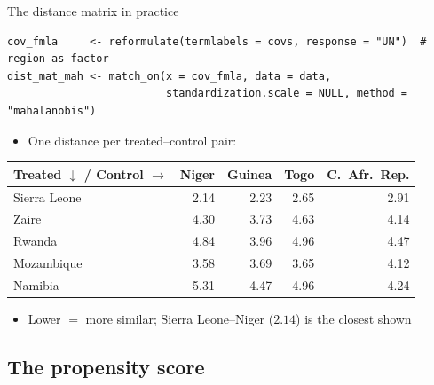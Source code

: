 \documentclass[table, xcolor = {dvipsnames}, 9pt]{beamer}
\theoremstyle{plain}
\newcommand{\mh}[1]{{\color{magenta}{#1}}}
\begin{document}
\begin{frame}[fragile]{The distance matrix in practice}
\begin{lstlisting}[style=Rstyle, basicstyle=\ttfamily\tiny, frame=single]
cov_fmla     <- reformulate(termlabels = covs, response = "UN")  # region as factor
dist_mat_mah <- match_on(x = cov_fmla, data = data,
                         standardization.scale = NULL, method = "mahalanobis")
\end{lstlisting}
\begin{itemize} \vfill
\item One \mh{Mahalanobis} distance per treated--control pair: \vfill
\end{itemize}
\footnotesize
\begin{table}[H]
\centering
\begin{tabular}{lrrrr}
\toprule
Treated $\downarrow$ / Control $\rightarrow$ & Niger & Guinea & Togo & C.\ Afr.\ Rep. \\
\midrule
Sierra Leone & 2.14 & 2.23 & 2.65 & 2.91 \\
Zaire & 4.30 & 3.73 & 4.63 & 4.14 \\
Rwanda & 4.84 & 3.96 & 4.96 & 4.47 \\
Mozambique & 3.58 & 3.69 & 3.65 & 4.12 \\
Namibia & 5.31 & 4.47 & 4.96 & 4.24 \\
\bottomrule
\end{tabular}
\end{table}
\normalsize
\begin{itemize}
\item Lower $=$ more similar; Sierra Leone--Niger ($2.14$) is the closest shown \vfill
\end{itemize}
\end{frame}
\subsection{The propensity score}
\end{document}
